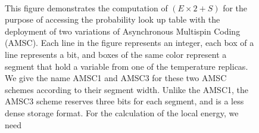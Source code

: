 \begin{figure}[ht]
  \centering
  \hspace{0.5cm}
  \\
\caption{This figure demonstrates the computation of $(E \times 2 +
  S)$ for the purpose of accessing the probability look up table with
  the deployment of two variations of Asynchronous Multispin Coding
  (AMSC).  Each line in the figure represents an integer, each box of
  a line represents a bit, and boxes of the same color represent a
  segment that hold a variable from one of the temperature replicas.
  We give the name AMSC1 and AMSC3 for these two AMSC schemes
  according to their segment width.  Unlike the AMSC1, the AMSC3
  scheme reserves three bits for each segment, and is a less dense
  storage format.  For the calculation of the local energy, we need
}
\end{figure}

